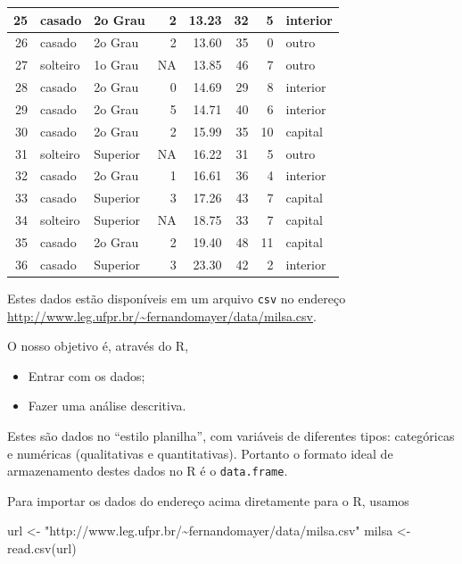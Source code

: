 \documentclass[
  10pt,
  a4paper]{book}
\newenvironment{Shaded}{\begin{snugshade}}{\end{snugshade}}
\newcommand{\FunctionTok}[1]{\textcolor[rgb]{0.00,0.00,0.00}{#1}}
\newcommand{\NormalTok}[1]{#1}
\newcommand{\OtherTok}[1]{\textcolor[rgb]{0.56,0.35,0.01}{#1}}
\newcommand{\StringTok}[1]{\textcolor[rgb]{0.31,0.60,0.02}{#1}}
\providecommand{\tightlist}{%
  \setlength{\itemsep}{0pt}\setlength{\parskip}{0pt}}
\begin{document}
\begin{tabular}{r|l|l|r|r|r|r|l}
\hline
25 & casado & 2o Grau & 2 & 13.23 & 32 & 5 & interior\\
\hline
26 & casado & 2o Grau & 2 & 13.60 & 35 & 0 & outro\\
\hline
27 & solteiro & 1o Grau & NA & 13.85 & 46 & 7 & outro\\
\hline
28 & casado & 2o Grau & 0 & 14.69 & 29 & 8 & interior\\
\hline
29 & casado & 2o Grau & 5 & 14.71 & 40 & 6 & interior\\
\hline
30 & casado & 2o Grau & 2 & 15.99 & 35 & 10 & capital\\
\hline
31 & solteiro & Superior & NA & 16.22 & 31 & 5 & outro\\
\hline
32 & casado & 2o Grau & 1 & 16.61 & 36 & 4 & interior\\
\hline
33 & casado & Superior & 3 & 17.26 & 43 & 7 & capital\\
\hline
34 & solteiro & Superior & NA & 18.75 & 33 & 7 & capital\\
\hline
35 & casado & 2o Grau & 2 & 19.40 & 48 & 11 & capital\\
\hline
36 & casado & Superior & 3 & 23.30 & 42 & 2 & interior\\
\hline
\end{tabular}

Estes dados estão disponíveis em um arquivo \texttt{csv} no endereço
\url{http://www.leg.ufpr.br/~fernandomayer/data/milsa.csv}.

O nosso objetivo é, através do R,

\begin{itemize}
\tightlist
\item
  Entrar com os dados;
\item
  Fazer uma análise descritiva.
\end{itemize}

Estes são dados no ``estilo planilha'', com variáveis de diferentes tipos:
categóricas e numéricas (qualitativas e quantitativas). Portanto o
formato ideal de armazenamento destes dados no R é o \texttt{data.frame}.

Para importar os dados do endereço acima diretamente para o R, usamos

\begin{Shaded}
\begin{Highlighting}[]
\NormalTok{url }\OtherTok{\textless{}{-}} \StringTok{"http://www.leg.ufpr.br/\textasciitilde{}fernandomayer/data/milsa.csv"}
\NormalTok{milsa }\OtherTok{\textless{}{-}} \FunctionTok{read.csv}\NormalTok{(url)}
\end{Highlighting}
\end{Shaded}
\end{document}
